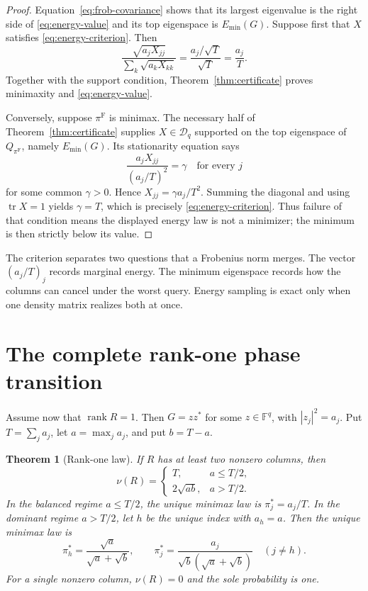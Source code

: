 \documentclass[11pt]{article}
\newtheorem{theorem}{Theorem}[section]
\theoremstyle{definition}
\newcommand{\F}{\mathbb F}
\newcommand{\D}{\mathcal D}
\newcommand{\tr}{\operatorname{tr}}
\newcommand{\rank}{\operatorname{rank}}
\begin{document}
\begin{proof}
Equation~\eqref{eq:frob-covariance} shows that its largest eigenvalue is the right side of
\eqref{eq:energy-value} and its top eigenspace is $E_{\min}(G)$.  Suppose first that $X$ satisfies
\eqref{eq:energy-criterion}.  Then
\[
  \frac{\sqrt{a_jX_{jj}}}{\sum_k\sqrt{a_kX_{kk}}}
  =\frac{a_j/\sqrt T}{\sqrt T}=\frac{a_j}{T}.
\]
Together with the support condition, Theorem~\ref{thm:certificate} proves minimaxity and
\eqref{eq:energy-value}.

Conversely, suppose $\pi^{\mathrm F}$ is minimax.  The necessary half of
Theorem~\ref{thm:certificate} supplies $X\in\D_q$ supported on the top eigenspace of
$Q_{\pi^{\mathrm F}}$, namely $E_{\min}(G)$.  Its stationarity equation says
\[
  \frac{a_jX_{jj}}{(a_j/T)^2}=\gamma
  \quad\text{for every }j
\]
for some common $\gamma>0$.  Hence $X_{jj}=\gamma a_j/T^2$.  Summing the diagonal and using
$\tr X=1$ yields $\gamma=T$, which is precisely \eqref{eq:energy-criterion}.  Thus failure of
that condition means the displayed energy law is not a minimizer; the minimum is then strictly
below its value.
\end{proof}

The criterion separates two questions that a Frobenius norm merges.  The vector
$(a_j/T)_j$ records marginal energy.  The minimum eigenspace records how the columns can cancel
under the worst query.  Energy sampling is exact only when one density matrix realizes both at
once.

\section{The complete rank-one phase transition}

Assume now that $\rank R=1$.  Then $G=zz^*$ for some $z\in\F^q$, with
$|z_j|^2=a_j$.  Put $T=\sum_ja_j$, let $a=\max_ja_j$, and put $b=T-a$.

\begin{theorem}[Rank-one law]
\label{thm:rank-one}
If $R$ has at least two nonzero columns, then
\begin{equation}
  \nu(R)=
  \begin{cases}
    T,&a\le T/2,\\[2mm]
    2\sqrt{ab},&a>T/2.
  \end{cases}
  \label{eq:rank-one-value}
\end{equation}
In the balanced regime $a\le T/2$, the unique minimax law is
$\pi_j^*=a_j/T$.  In the dominant regime $a>T/2$, let $h$ be the unique index with $a_h=a$.
Then the unique minimax law is
\begin{equation}
  \pi_h^*=\frac{\sqrt a}{\sqrt a+\sqrt b},
  \qquad
  \pi_j^*=\frac{a_j}{\sqrt b(\sqrt a+\sqrt b)}\quad(j\ne h).
  \label{eq:rank-one-law}
\end{equation}
For a single nonzero column, $\nu(R)=0$ and the sole probability is one.
\end{theorem}
\end{document}

